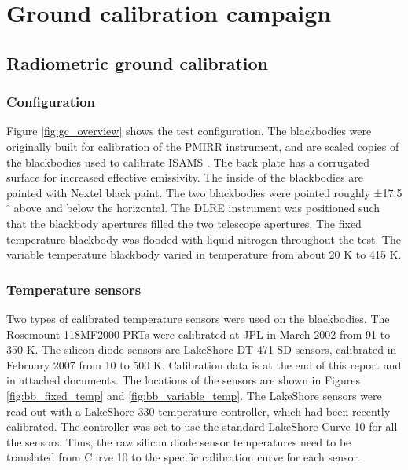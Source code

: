 \section{Ground calibration campaign}

\subsection{Radiometric ground calibration}
\subsubsection{Configuration}
Figure \ref{fig:gc_overview} shows the test configuration.
The blackbodies were originally built for calibration of the PMIRR instrument, and are scaled copies of the blackbodies used to calibrate ISAMS \cite{Nightingale_1991}. The back plate has a corrugated surface for increased effective emissivity.
The inside of the blackbodies are painted with Nextel black paint.
The two blackbodies were pointed roughly ±17.5$^\circ$ above and below the horizontal.
The DLRE instrument was positioned such that the blackbody apertures filled the two telescope apertures.
The fixed temperature blackbody was flooded with liquid nitrogen throughout the test.
The variable temperature blackbody varied in temperature from about 20 K to 415 K.

\subsubsection{Temperature sensors}
Two types of calibrated temperature sensors were used on the blackbodies.
The Rosemount 118MF2000 PRTs were calibrated at JPL in March 2002 from 91 to 350 K.
The silicon diode sensors are LakeShore DT-471-SD sensors, calibrated in February 2007 from 10 to 500 K.
Calibration data is at the end of this report and in attached documents.
The locations of the sensors are shown in Figures \ref{fig:bb_fixed_temp} and \ref{fig:bb_variable_temp}.
The LakeShore sensors were read out with a LakeShore 330 temperature controller, which had been recently calibrated.
The controller was set to use the standard LakeShore Curve 10 for all the sensors.
Thus, the raw silicon diode sensor temperatures need to be translated from Curve 10 to the specific calibration curve for each sensor.

